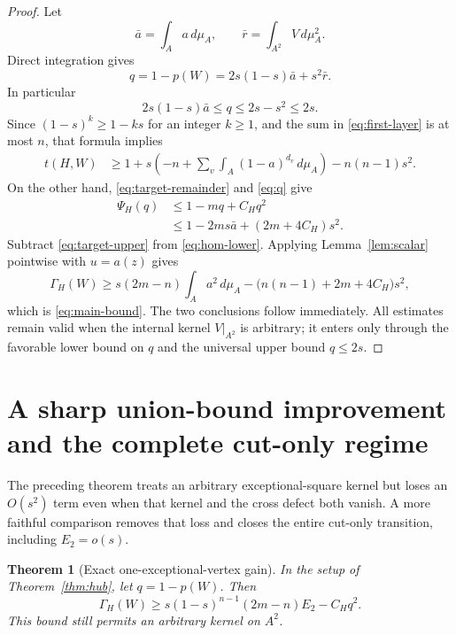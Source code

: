 \documentclass[11pt]{article}
\newtheorem{theorem}{Theorem}[section]
\newcommand{\dd}{\,d}
\begin{document}
\begin{proof}
Let
\[
 \bar a=\int_Aa\dd\mu_A,
 \qquad
 \bar r=\int_{A^2}V\dd\mu_A^2.
\]
Direct integration gives
\begin{equation}
 q=1-p(W)=2s(1-s)\bar a+s^2\bar r.
 \label{eq:q}
\end{equation}
In particular
\[
 2s(1-s)\bar a\leq q\leq2s-s^2\leq2s.
\]
Since $(1-s)^k\geq1-ks$ for an integer $k\geq1$, and the sum in
\eqref{eq:first-layer} is at most $n$, that formula implies
\begin{align}
 t(H,W)
 &\geq1+s\left(
 -n+\sum_v\int_A(1-a)^{d_v}\dd\mu_A
 \right)-n(n-1)s^2.
 \label{eq:hom-lower}
\end{align}
On the other hand, \eqref{eq:target-remainder} and \eqref{eq:q} give
\begin{align}
 \Psi_H(q)
 &\leq1-mq+C_Hq^2\\
 &\leq1-2ms\bar a+(2m+4C_H)s^2.
 \label{eq:target-upper}
\end{align}
Subtract \eqref{eq:target-upper} from \eqref{eq:hom-lower}.  Applying
Lemma~\ref{lem:scalar} pointwise with $u=a(z)$ gives
\[
 \Gamma_H(W)
 \geq s(2m-n)\int_Aa^2\dd\mu_A
 -\bigl(n(n-1)+2m+4C_H\bigr)s^2,
\]
which is \eqref{eq:main-bound}.  The two conclusions follow immediately.
All estimates remain valid when the internal kernel $V|_{A^2}$ is arbitrary;
it enters only through the favorable lower bound on $q$ and the universal
upper bound $q\leq2s$.
\end{proof}


\section{A sharp union-bound improvement and the complete cut-only regime}

The preceding theorem treats an arbitrary exceptional-square kernel but loses
an $O(s^2)$ term even when that kernel and the cross defect both vanish.  A
more faithful comparison removes that loss and closes the entire cut-only
transition, including $E_2=o(s)$.

\begin{theorem}[Exact one-exceptional-vertex gain]
\label{thm:union-improvement}
In the setup of Theorem~\ref{thm:hub}, let $q=1-p(W)$.  Then
\begin{equation}
 \Gamma_H(W)\geq
 s(1-s)^{n-1}(2m-n)E_2-C_Hq^2.
 \label{eq:sharp-bound}
\end{equation}
This bound still permits an arbitrary kernel on $A^2$.
\end{theorem}
\end{document}
